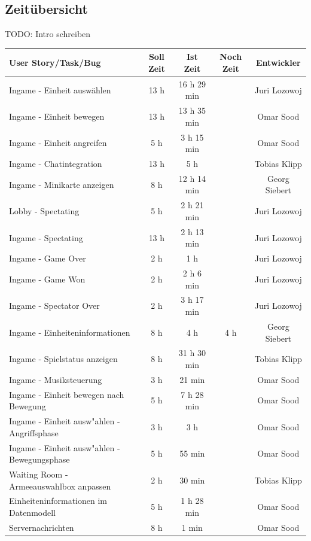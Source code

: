 \documentclass[12pt, titlepage]{scrartcl}
\begin{document}
    	\subsection{Zeit\"ubersicht}
    		TODO: Intro schreiben
    		\begin{longtable}[H]{p{6cm} c c c c }
    			\label{Time_2}
    			\textbf{User Story/Task/Bug} & \textbf{Soll Zeit} & \textbf{Ist Zeit} & \textbf{Noch Zeit} & \textbf{Entwickler} \\
    			\toprule
    			\endhead
    			Ingame - Einheit ausw\"ahlen & 13 h & 16 h 29 min &  & Juri Lozowoj \\
    			Ingame - Einheit bewegen & 13 h & 13 h 35 min &  & Omar Sood \\
    			Ingame - Einheit angreifen & 5 h & 3 h 15 min &  & Omar Sood \\
    			Ingame - Chatintegration & 13 h & 5 h &  & Tobias Klipp \\
    			Ingame - Minikarte anzeigen & 8 h & 12 h 14 min &  & Georg Siebert \\
    			Lobby - Spectating & 5 h & 2 h 21 min &  & Juri Lozowoj \\
    			Ingame - Spectating & 13 h & 2 h 13 min &  & Juri Lozowoj \\
    			Ingame - Game Over & 2 h & 1 h  & & Juri Lozowoj \\
    			Ingame - Game Won & 2 h & 2 h 6 min & & Juri Lozowoj \\
    			Ingame - Spectator Over & 2 h & 3 h 17 min & & Juri Lozowoj \\
    			Ingame - Einheiteninformationen & 8 h & 4 h & 4 h & Georg Siebert \\
    			Ingame - Spielstatus anzeigen & 8 h & 31 h 30 min &  & Tobias Klipp \\
    			Ingame - Musiksteuerung & 3 h & 21 min &  & Omar Sood \\
    			Ingame - Einheit bewegen nach Bewegung & 5 h & 7 h 28 min & & Omar Sood \\
    			Ingame - Einheit ausw"ahlen - Angriffsphase & 3 h & 3 h & & Omar Sood \\
    			Ingame - Einheit ausw"ahlen - Bewegungsphase & 5 h & 55 min & & Omar Sood \\
    			\midrule
    			Waiting Room - Armeeauswahlbox anpassen & 2 h & 30 min & & Tobias Klipp \\
    			Einheiteninformationen im Datenmodell & 5 h & 1 h 28 min &  & Omar Sood \\
    			Servernachrichten & 8 h & 1 min &  & Omar Sood \\

\end{longtable}
\end{document}
